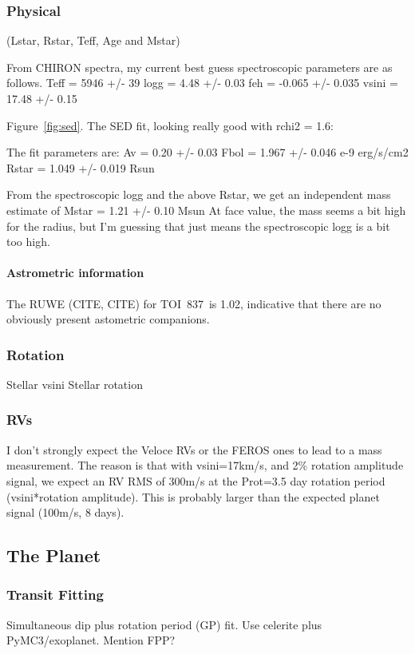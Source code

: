 \documentclass[12pt,twocolumn,tighten]{aastex62}
\newcommand{\tn}{TOI~837} %
\begin{document}
\subsubsection{Physical}
 (Lstar, Rstar, Teff, Age and Mstar)

From CHIRON spectra, my current best guess spectroscopic parameters
 are as follows.
 Teff = 5946 +/- 39
 logg = 4.48 +/- 0.03
 feh = -0.065 +/- 0.035
 vsini = 17.48 +/- 0.15

Figure~\ref{fig:sed}.
The SED fit, looking really good with rchi2 = 1.6: 

The fit parameters are: 
Av = 0.20 +/- 0.03
Fbol = 1.967 +/- 0.046 e-9 erg/s/cm2 
Rstar = 1.049 +/- 0.019 Rsun 

From the spectroscopic logg and the above Rstar, we get an independent
mass estimate of 
Mstar = 1.21 +/- 0.10 Msun 
At face value, the mass seems a bit high for the radius, but I'm
guessing that just means the spectroscopic logg is a bit too high. 


\paragraph{Astrometric information}
The RUWE (CITE, CITE) for \tn\ is 1.02, indicative that there are no
obviously present astometric companions.


\subsubsection{Rotation}
Stellar vsini
Stellar rotation

\subsubsection{RVs}
I don't strongly expect the Veloce RVs or the FEROS ones to lead to a
mass measurement. The reason is that with vsini=17km/s, and 2\%
rotation amplitude signal, we expect an RV RMS of 300m/s at the
Prot=3.5 day rotation period (vsini*rotation amplitude). This is
probably larger than the expected planet signal (100m/s, 8 days).




\subsection{The Planet}
\label{subsec:planet}

\subsubsection{Transit Fitting}
Simultaneous dip plus rotation period (GP) fit. Use celerite plus PyMC3/exoplanet.
Mention FPP?
\end{document}
